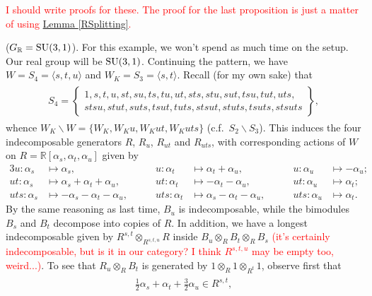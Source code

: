 \noindent\textcolor{red}{I should write proofs for these. The proof for the last proposition is just a matter of using \hyperref[RSplitting]{Lemma \ref*{RSplitting}}.}
\newpage

\noindent\begin{example}\textup{($G_\mathbb{R} = \textup{SU}(3,1)$).} For this example, we won't spend as much time on the setup. Our real group will be $\textup{SU}(3,1)$. Continuing the pattern, we have $W = S_4 = \langle s, t, u \rangle$ and $W_K = S_3 = \langle s, t\rangle$. Recall (for my own sake) that
\begin{align*}
\begin{split}
S_4 = \left\{\begin{matrix}1, s, t, u, st, su, ts, tu, ut, sts, stu, sut, tsu, tut, uts,\\ stsu, stut, suts, tsut, tuts, stsut, stuts, tsuts, stsuts\end{matrix}\right\},
\end{split}
\end{align*}
\noindent whence $W_K\backslash W = \{W_K, W_Ku, W_Kut, W_Kuts\}$ (c.f.\ $S_2\backslash S_3$). This induces the four indecomposable generators $R$, $R_u$, $R_{ut}$ and $R_{uts}$, with corresponding actions of $W$ on $R = \mathbb{R}[\alpha_s, \alpha_t, \alpha_u]$ given by
\begin{alignat*}{3}
u : \alpha_s &\mapsto \alpha_s, \qquad &u : \alpha_t &\mapsto \alpha_t + \alpha_u, \qquad &u : \alpha_u &\mapsto -\alpha_u;\\
ut : \alpha_s &\mapsto \alpha_s + \alpha_t + \alpha_u, \qquad &ut : \alpha_t &\mapsto -\alpha_t - \alpha_u, \qquad &ut : \alpha_u &\mapsto \alpha_t;\\
uts : \alpha_s &\mapsto -\alpha_s - \alpha_t - \alpha_u, \qquad &uts : \alpha_t &\mapsto \alpha_s - \alpha_t - \alpha_u, \qquad &uts : \alpha_u &\mapsto \alpha_t.
\end{alignat*}
\noindent By the same reasoning as last time, $B_u$ is indecomposable, while the bimodules $B_s$ and $B_t$ decompose into copies of $R$. In addition, we have a longest indecomposable given by $R^{s,t} \otimes_{R^{s,t,u}} R$ inside $B_u \otimes_R B_t \otimes_R B_s$ \textcolor{red}{(it's certainly indecomposable, but is it in our category? I think $R^{s,t,u}$ may be empty too, weird...)}. To see that $R_u \otimes_R B_t$ is generated by $1 \otimes_R 1 \otimes_{R^t} 1$, observe first that
\begin{align*}
\begin{split}
\frac{1}{2}\alpha_s + \alpha_t + \frac{3}{2}\alpha_u \in R^{s,t},

\end{split}
\end{align*}
\end{example}
